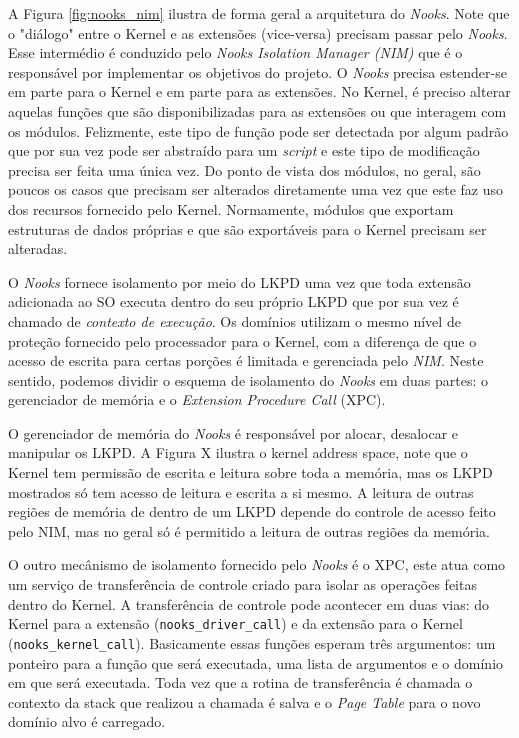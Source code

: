 A Figura \ref{fig:nooks_nim} ilustra de forma geral a arquitetura do
\emph{Nooks}. Note que o "diálogo" entre o Kernel e as extensões (vice-versa)
precisam passar pelo \emph{Nooks}. Esse intermédio é conduzido pelo \emph{Nooks
Isolation Manager (NIM)} que é o responsável por implementar os objetivos do
projeto. O \emph{Nooks} precisa estender-se em parte para o Kernel e em parte
para as extensões. No Kernel, é preciso alterar aquelas funções que são
disponibilizadas para as extensões ou que interagem com os módulos. Felizmente,
este tipo de função pode ser detectada por algum padrão que por sua vez pode
ser abstraído para um \emph{script} e este tipo de modificação precisa ser
feita uma única vez. Do ponto de vista dos módulos, no geral, são poucos os
casos que precisam ser alterados diretamente uma vez que este faz uso dos
recursos fornecido pelo Kernel. Normamente, módulos que exportam estruturas de
dados próprias e que são exportáveis para o Kernel precisam ser alteradas.

O \emph{Nooks} fornece isolamento por meio do LKPD uma vez que toda extensão
adicionada ao SO executa dentro do seu próprio LKPD que por sua vez é chamado
de \emph{contexto de execução}. Os domínios utilizam o mesmo nível de proteção
fornecido pelo processador para o Kernel, com a diferença de que o acesso de
escrita para certas porções é limitada e gerenciada pelo \emph{NIM}. Neste
sentido, podemos dividir o esquema de isolamento do \emph{Nooks} em duas partes:
o gerenciador de memória e o \emph{Extension Procedure Call} (XPC).


O gerenciador de memória do \emph{Nooks} é responsável por alocar, desalocar e
manipular os LKPD. A Figura X ilustra o kernel address space, note que o Kernel
tem permissão de escrita e leitura sobre toda a memória, mas os LKPD mostrados
só tem acesso de leitura e escrita a si mesmo. A leitura de outras regiões de
memória de dentro de um LKPD depende do controle de acesso feito pelo NIM, mas
no geral só é permitido a leitura de outras regiões da memória.

O outro mecânismo de isolamento fornecido pelo \emph{Nooks} é o XPC, este atua
como um serviço de transferência de controle criado para isolar as operações
feitas dentro do Kernel. A transferência de controle pode acontecer em duas
vias: do Kernel para a extensão (\texttt{nooks\_driver\_call}) e da extensão
para o Kernel (\texttt{nooks\_kernel\_call}). Basicamente essas funções esperam
três argumentos: um ponteiro para a função que será executada, uma lista de
argumentos e o domínio em que será executada. Toda vez que a rotina de
transferência é chamada o contexto da stack que realizou a chamada é salva e o
\emph{Page Table} para o novo domínio alvo é carregado.

